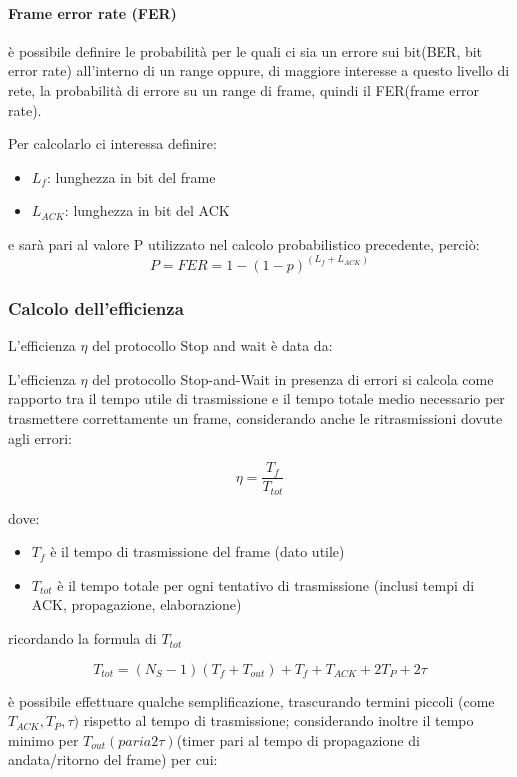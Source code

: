\paragraph{Frame error rate (FER)} è possibile definire le probabilità per le quali ci sia un errore sui bit(BER, bit error rate) all'interno di un range oppure, di maggiore interesse a questo livello di rete, la probabilità di errore su un range di frame, quindi il FER(frame error rate).

Per calcolarlo ci interessa definire:
\begin{itemize}
    \item $L_f$: lunghezza in bit del frame
    \item $L_{ACK}$: lunghezza in bit del ACK
\end{itemize}

e sarà pari al valore P utilizzato nel calcolo probabilistico precedente, perciò: 
\begin{equation}
P = FER = 1 - (1 - p)^{(L_f + L_{ACK})}
\end{equation}
\subsubsection{Calcolo dell'efficienza}
L'efficienza $\eta$ del protocollo Stop and wait è data da:

L'efficienza $\eta$ del protocollo Stop-and-Wait in presenza di errori si calcola come rapporto tra il tempo utile di trasmissione e il tempo totale medio necessario per trasmettere correttamente un frame, considerando anche le ritrasmissioni dovute agli errori:

\begin{equation}
\eta = \frac{T_f}{T_{tot}}
\end{equation}

dove:
\begin{itemize}
    \item $T_f$ è il tempo di trasmissione del frame (dato utile)
    \item $T_{tot}$ è il tempo totale per ogni tentativo di trasmissione (inclusi tempi di ACK, propagazione, elaborazione)
\end{itemize}

ricordando la formula di $T_{tot}$

\begin{equation}
T_{tot} = (N_S - 1)(T_f + T_{out}) + T_f + T_{ACK} + 2T_P + 2\tau
\end{equation}

è possibile effettuare qualche semplificazione, trascurando termini piccoli (come $T_{ACK}, T_P, \tau)$ rispetto al tempo di trasmissione; considerando inoltre il tempo minimo per $T_{out}(pari a 2\tau)$(timer pari al tempo di propagazione di andata/ritorno del frame) per cui:

